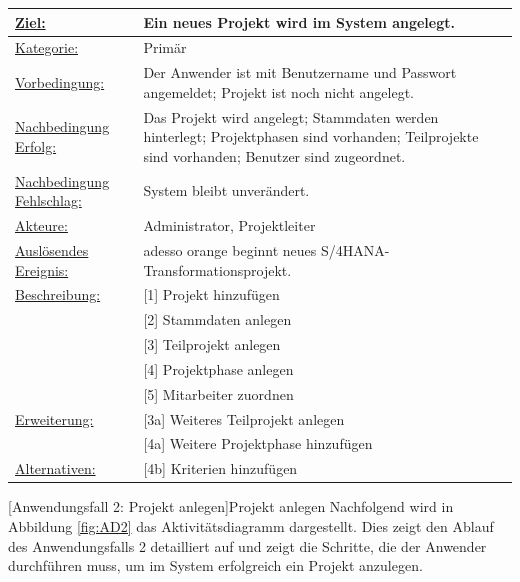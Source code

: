 \begin{tabularx}{\textwidth}{|p{}|p{}|}
        \hline
        \underline{Ziel:} & Ein neues Projekt wird im System angelegt.\\\hline
        \underline{Kategorie:} & Primär\\\hline
        \underline{Vorbedingung:} & Der Anwender ist mit Benutzername und Passwort angemeldet; Projekt ist noch nicht angelegt.\\\hline
        \underline{Nachbedingung Erfolg:} & Das Projekt wird angelegt; Stammdaten werden hinterlegt; Projektphasen sind vorhanden; Teilprojekte sind vorhanden; Benutzer sind zugeordnet.\\\hline
        \underline{Nachbedingung Fehlschlag:} & System bleibt unverändert.\\\hline
        \underline{Akteure:} & Administrator, Projektleiter\\\hline
        \underline{Auslösendes Ereignis:} & adesso orange beginnt neues S/4HANA-Transformationsprojekt.\\\hline        
        \multirow{1}{*}{\underline{Beschreibung:}} & [1] Projekt hinzufügen\\
        & [2] Stammdaten anlegen\\
        & [3] Teilprojekt anlegen\\
        & [4] Projektphase anlegen\\
        & [5] Mitarbeiter zuordnen\\\hline
        \multirow{1}{*}{\underline{Erweiterung:}} & [3a] Weiteres Teilprojekt anlegen\\
        & [4a] Weitere Projektphase hinzufügen\\\hline
        \underline{Alternativen:} & [4b] Kriterien hinzufügen\\\hline
\end{tabularx}
[Anwendungsfall 2: Projekt anlegen]{Projekt anlegen}
\newpage
Nachfolgend wird in Abbildung \ref{fig:AD2} das Aktivitätsdiagramm dargestellt. Dies zeigt den Ablauf des Anwendungsfalls 2 detailliert auf und zeigt die Schritte, die der Anwender durchführen muss, um im System erfolgreich ein Projekt anzulegen.
